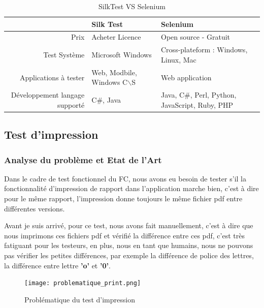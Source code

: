     \begin{table}[H]
        \centering
        \begin{tabular}{|r|m{5cm}|m{5cm}|}
        \hline
        & \Large{\textbf{Silk Test}} & \Large{\textbf{Selenium}} \\
        \hline
            Prix & Acheter Licence & Open source - Gratuit \\
        \hline
            Test Système & Microsoft Windows & Cross-plateform : Windows, Linux, Mac\\
        \hline 
            Applications à tester & Web, Modbile, Windows C$\backslash$S & Web application\\
        \hline
            Développement langage supporté & C\#, Java & Java, C\#, Perl, Python, JavaScript, Ruby, PHP\\
        \hline
        \end{tabular}
        \caption{SilkTest VS Selenium}
        \label{tab:Silk_vs_Selenium_label}
    \end{table}
\newpage
\subsection{Test d'impression}
    \subsubsection{Analyse du problème et Etat de l'Art}
    Dans le cadre de test fonctionnel du FC, nous avons eu besoin de tester s'il la fonctionnalité d'impression de rapport dans l'application marche bien, c'est à dire pour le même rapport, l'impression donne toujours le même fichier pdf entre différentes versions.
    
    \par Avant je suis arrivé, pour ce test, nous avons fait manuellement, c'est à dire que nous imprimons ces fichiers pdf et vérifié la différence entre ces pdf, c'est très fatiguant pour les testeurs, en plus, nous en tant que humains, nous ne pouvons pas vérifier les petites différences, par exemple la différence de police des lettres, la différence entre lettre \textbf{'o'} et \textbf{'0'}.
    \begin{figure}[H]
        \centering
        \texttt{[image: problematique\_print.png]}
        \caption{Problématique du test d'impression }
        \label{fig:prolematique_TestPrint_label}
    \end{figure}
    
